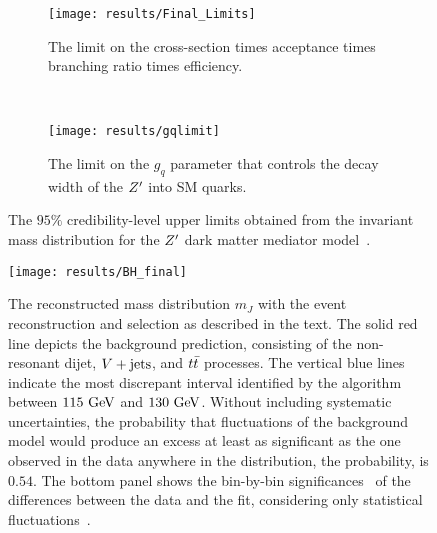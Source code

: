 \begin{figure}[htbp]
 \centering
 \begin{subfigure}[t]{0.5\textwidth}
  \centering
  \texttt{[image: results/Final\_Limits]}
  \caption{The limit on the cross-section times acceptance times branching ratio times efficiency.}
  \label{fig:cross_section_limits}
 \end{subfigure}%
 ~
 \begin{subfigure}[t]{0.5\textwidth}
  \centering
  \texttt{[image: results/gqlimit]}
  \caption{The limit on the $g_{q}$ parameter that controls the decay width of the $Z'$ into SM quarks.}
  \label{fig:gq_limits}
 \end{subfigure}
 \caption{The $95\%$ credibility-level upper limits obtained from the invariant mass distribution for the $Z'$ dark matter mediator model~\cite{ATLAS-CONF-2018-052}.}
 \label{fig:Zprime_limits}
\end{figure}

\clearpage
\begin{figure}[htbp]
 \centering
 \texttt{[image: results/BH\_final]}
 \caption{The reconstructed mass distribution $m_{J}$ with the event reconstruction and selection as described in the text.
  The solid red line depicts the background prediction, consisting of the non-resonant dijet, $V + \text{jets}$, and $t\bar{t}$ processes.
  The vertical blue lines indicate the most discrepant interval identified by the \BumpHunter{} algorithm between $115~\mathrm{GeV}$ and $130~\mathrm{GeV}$.
  Without including systematic uncertainties, the probability that fluctuations of the background model would produce an excess at least as significant as the one observed in the data anywhere in the distribution, the \BumpHunter{} probability, is $0.54$.
  The bottom panel shows the bin-by-bin significances~\cite{Choudalakis:2012} of the differences between the data and the fit, considering only statistical fluctuations~\cite{ATLAS-CONF-2018-052}.
 }
 \label{fig:BumpHunter_scan}
\end{figure}
